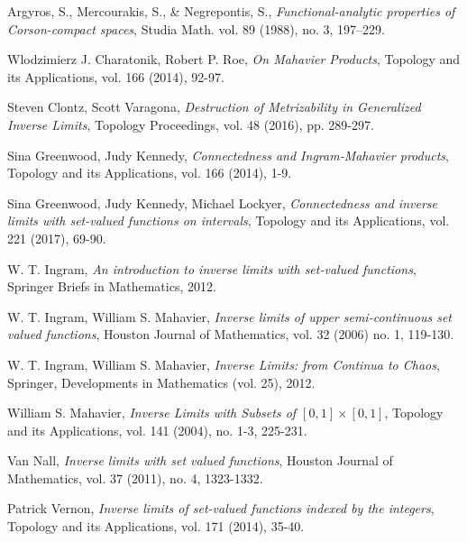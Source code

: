 \documentclass{article}
\theoremstyle{plain}
\theoremstyle{definition}
\theoremstyle{remark}
\begin{document}
\begin{thebibliography}{999}

Argyros, S., Mercourakis, S., \& Negrepontis, S., \emph{Functional-analytic properties of Corson-compact spaces}, Studia Math. vol. 89 (1988), no. 3, 197–229.

Wlodzimierz J. Charatonik, Robert P. Roe, \emph{On Mahavier Products}, Topology and its
Applications, vol. 166 (2014), 92-97.

Steven Clontz, Scott Varagona, \emph{Destruction of Metrizability in Generalized Inverse Limits}, Topology Proceedings, vol. 48 (2016), pp. 289-297.

Sina Greenwood, Judy Kennedy, \emph{Connectedness and Ingram-Mahavier products}, Topology and its Applications, vol. 166 (2014), 1-9.

Sina Greenwood, Judy Kennedy, Michael Lockyer, \emph{Connectedness and inverse limits with set-valued functions on intervals}, Topology and its Applications, vol. 221 (2017), 69-90.

W. T. Ingram, \emph{An introduction to inverse limits with set-valued functions}, Springer Briefs in
Mathematics, 2012.

W. T. Ingram, William S. Mahavier, \emph{Inverse limits of upper semi-continuous set valued functions}, Houston Journal of Mathematics, vol. 32 (2006) no. 1, 119-130.

W. T. Ingram, William S. Mahavier, \emph{Inverse Limits: from Continua to Chaos}, Springer, Developments in Mathematics (vol. 25), 2012.

William S. Mahavier, \emph{Inverse Limits with Subsets of $[0,1] \times [0,1]$}, Topology and its Applications, vol. 141 (2004), no. 1-3, 225-231.

Van Nall, \emph{Inverse limits with set valued functions}, Houston Journal of Mathematics, vol. 37 (2011), no. 4, 1323-1332.

Patrick Vernon, \emph{Inverse limits of set-valued functions indexed by the integers}, Topology and its Applications, vol. 171 (2014), 35-40.

\end{thebibliography}
\end{document}
